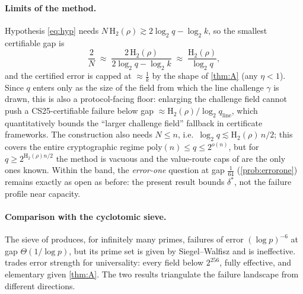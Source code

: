 \documentclass[11pt]{article}
\theoremstyle{definition}
\theoremstyle{remark}
\newcommand{\Hb}{\mathrm{H}_2}
\begin{document}
\paragraph{Limits of the method.}
Hypothesis \eqref{eq:hyp} needs $N\,\Hb(\rho)\gtrsim2\log_2q-\log_2k$, so the smallest certifiable gap is
\[
\frac2N\;\approx\;\frac{2\,\Hb(\rho)}{2\log_2q-\log_2k}\;\approx\;\frac{\Hb(\rho)}{\log_2 q},
\]
and the certified error is capped at $\approx\frac1k$ by the shape of \cref{thm:A} (any $\eta<1$). Since $q$ enters only as the size of the field from which the line challenge $\gamma$ is drawn, this is also a protocol-facing floor: enlarging the challenge field cannot push a CS25-certifiable failure below gap $\approx\Hb(\rho)/\log_2 q_{\mathrm{line}}$, which quantitatively bounds the ``larger challenge field'' fallback in certificate frameworks. The construction also needs $N\le n$, i.e.\ $\log_2q\lesssim\Hb(\rho)\,n/2$; this covers the entire cryptographic regime $\mathrm{poly}(n)\le q\le2^{o(n)}$, but for $q\ge2^{\Hb(\rho)n/2}$ the method is vacuous and the value-route caps of \cite{Cho26a,Cho26b} are the only ones known. Within the band, the \emph{error-one} question at gap $\frac1{64}$ (\cref{prob:errorone}) remains exactly as open as before: the present result bounds $\delta^*$, not the failure profile near capacity.

\paragraph{Comparison with the cyclotomic sieve.}
The sieve of \cite{Cho26a} produces, for infinitely many primes, failures of error $(\log p)^{-6}$ at gap $\Theta(1/\log p)$, but its prime set is given by Siegel--Walfisz and is ineffective.  trades error strength for universality: every field below $2^{256}$, fully effective, and elementary given \cref{thm:A}. The two results triangulate the failure landscape from different directions.
\end{document}
